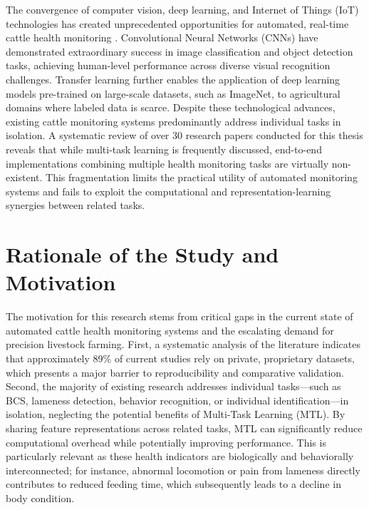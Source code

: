 The convergence of computer vision, deep learning, and Internet of Things (IoT) technologies has created unprecedented opportunities for automated, real-time cattle health monitoring \cite{neethirajan2020digitalization}. Convolutional Neural Networks (CNNs) have demonstrated extraordinary success in image classification and object detection tasks, achieving human-level performance across diverse visual recognition challenges. Transfer learning further enables the application of deep learning models pre-trained on large-scale datasets, such as ImageNet, to agricultural domains where labeled data is scarce. Despite these technological advances, existing cattle monitoring systems predominantly address individual tasks in isolation. A systematic review of over 30 research papers conducted for this thesis reveals that while multi-task learning is frequently discussed, end-to-end implementations combining multiple health monitoring tasks are virtually non-existent. This fragmentation limits the practical utility of automated monitoring systems and fails to exploit the computational and representation-learning synergies between related tasks.


\section{Rationale of the Study and Motivation}

The motivation for this research stems from critical gaps in the current state of automated cattle health monitoring systems and the escalating demand for precision livestock farming. First, a systematic analysis of the literature indicates that approximately 89\% of current studies rely on private, proprietary datasets, which presents a major barrier to reproducibility and comparative validation. Second, the majority of existing research addresses individual tasks---such as BCS, lameness detection, behavior recognition, or individual identification---in isolation, neglecting the potential benefits of Multi-Task Learning (MTL). By sharing feature representations across related tasks, MTL can significantly reduce computational overhead while potentially improving performance. This is particularly relevant as these health indicators are biologically and behaviorally interconnected; for instance, abnormal locomotion or pain from lameness directly contributes to reduced feeding time, which subsequently leads to a decline in body condition.


